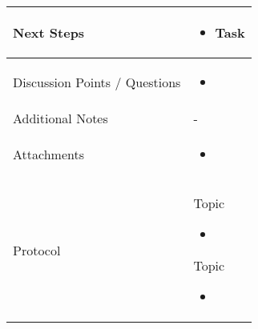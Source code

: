 \documentclass[a4paper,11pt]{article}
\begin{document}
\begin{longtable}{|p{4cm}|p{10cm}|}
		\hline
		Next Steps & \begin{itemize}
			\item Task
		\end{itemize} \\
		\hline
		Discussion Points / Questions & \begin{itemize}
			\item 
		\end{itemize} \\
		\hline
		Additional Notes & - \\
		\hline
		Attachments  & \begin{itemize}
			\item 
		\end{itemize} \\
		\hline
		Protocol  & 
		Topic
		\begin{itemize}
			\item 
		\end{itemize}
		
		Topic
		\begin{itemize}
			\item 
		\end{itemize} \\
		\hline
	\end{longtable}
	
\end{document}

